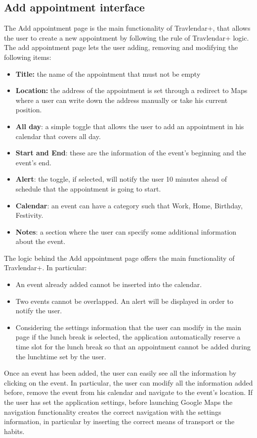 \subsection*{Add appointment interface}
The Add appointment page is the main functionality of Travlendar+, that allows the user to create a new appointment by following the rule of Travlendar+ logic. 
The add appointment page lets the user adding, removing and modifying the following items:
\begin{itemize}
\item \textbf{Title:} the name of the appointment that must not be empty
\item \textbf{Location:} the address of the appointment is set through a redirect to Maps where a user can write down the address manually or take his current position. 
\item \textbf{All day}: a simple toggle that allows the user to add an appointment in his calendar that covers all day.
\item \textbf{Start and End}: these are the information of the event's beginning and the event's end.
\item \textbf{Alert}: the toggle, if selected, will notify the user 10 minutes ahead of schedule that the appointment is going to start.
\item \textbf{Calendar}: an event can have a category such that Work, Home, Birthday, Festivity.
\item \textbf{Notes}: a section where the user can specify some additional information about the event.
\end{itemize}

The logic behind the Add appointment page offers the main functionality of Travlendar+. In particular:
\begin{itemize}
\item An event already added cannot be inserted into the calendar.
\item Two events cannot be overlapped. An alert will be displayed in order to notify the user.
\item Considering the settings information that the user can modify in the main page if the lunch break is selected, the application automatically reserve a time slot for the lunch break so that an appointment cannot be added during the lunchtime set by the user.
\end{itemize}

Once an event has been added, the user can easily see all the information by clicking on the event. In particular, the user can modify all the information added before, remove the event from his calendar and navigate to the event's location. If the user has set the application settings, before launching Google Maps the navigation functionality creates the correct navigation with the settings information, in particular by inserting the correct means of transport or the habits.

